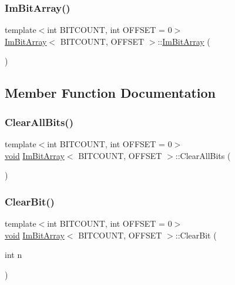 \subsubsection{\texorpdfstring{Im\+Bit\+Array()}{ImBitArray()}}
{\footnotesize\ttfamily template$<$int B\+I\+T\+C\+O\+U\+NT, int O\+F\+F\+S\+ET = 0$>$ \\
\hyperlink{structImBitArray}{Im\+Bit\+Array}$<$ B\+I\+T\+C\+O\+U\+NT, O\+F\+F\+S\+ET $>$\+::\hyperlink{structImBitArray}{Im\+Bit\+Array} (\begin{DoxyParamCaption}{ }\end{DoxyParamCaption})\hspace{0.3cm}{\ttfamily [inline]}}



\subsection{Member Function Documentation}
\mbox{\label{structImBitArray_ae0cc61bba70a3f2994f28130d9de76f4}} 
\subsubsection{\texorpdfstring{Clear\+All\+Bits()}{ClearAllBits()}}
{\footnotesize\ttfamily template$<$int B\+I\+T\+C\+O\+U\+NT, int O\+F\+F\+S\+ET = 0$>$ \\
\hyperlink{imgui__impl__opengl3__loader_8h_ac668e7cffd9e2e9cfee428b9b2f34fa7}{void} \hyperlink{structImBitArray}{Im\+Bit\+Array}$<$ B\+I\+T\+C\+O\+U\+NT, O\+F\+F\+S\+ET $>$\+::Clear\+All\+Bits (\begin{DoxyParamCaption}{ }\end{DoxyParamCaption})\hspace{0.3cm}{\ttfamily [inline]}}

\mbox{\label{structImBitArray_a48d77393cf81d3a7c4b94a90be6ee66f}} 
\subsubsection{\texorpdfstring{Clear\+Bit()}{ClearBit()}}
{\footnotesize\ttfamily template$<$int B\+I\+T\+C\+O\+U\+NT, int O\+F\+F\+S\+ET = 0$>$ \\
\hyperlink{imgui__impl__opengl3__loader_8h_ac668e7cffd9e2e9cfee428b9b2f34fa7}{void} \hyperlink{structImBitArray}{Im\+Bit\+Array}$<$ B\+I\+T\+C\+O\+U\+NT, O\+F\+F\+S\+ET $>$\+::Clear\+Bit (\begin{DoxyParamCaption}\item[{int}]{n }\end{DoxyParamCaption})\hspace{0.3cm}{\ttfamily [inline]}}

